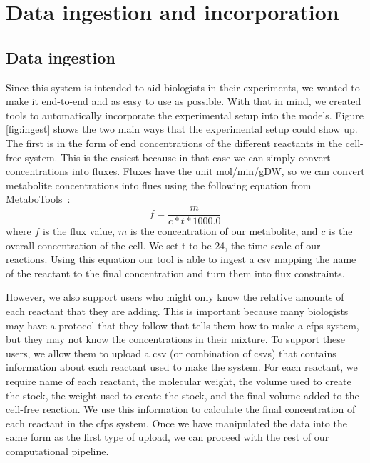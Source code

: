 \section{Data ingestion and incorporation}

\subsection{Data ingestion}
Since this system is intended to aid biologists in their experiments, we wanted to make it end-to-end and as easy to use as possible.
With that in mind, we created tools to automatically incorporate the experimental setup into the models.
Figure \ref{fig:ingest} shows the two main ways that the experimental setup could show up.
The first is in the form of end concentrations of the different reactants in the cell-free system.
This is the easiest because in that case we can simply convert concentrations into fluxes.
Fluxes have the unit mol/min/gDW, so we can convert metabolite concentrations into flues using the following equation from MetaboTools~\cite{aurich2016metabotools}:
\begin{equation}
f = \frac{m}{c * t * 1000.0}
\end{equation}
where $f$ is the flux value, $m$ is the concentration of our metabolite, and $c$ is the overall concentration of the cell.
We set t to be 24, the time scale of our reactions.
Using this equation our tool is able to ingest a \gls{csv} mapping the name of the reactant to the final concentration and turn them into flux constraints.

However, we also support users who might only know the relative amounts of each reactant that they are adding.
This is important because many biologists may have a protocol that they follow that tells them how to make a \gls{cfps} system, but they may not know the concentrations in their mixture.
To support these users, we allow them to upload a \gls{csv} (or combination of \glspl{csv}) that contains information about each reactant used to make the system.
For each reactant, we require name of each reactant, the molecular weight, the volume used to create the stock, the weight used to create the stock, and the final volume added to the cell-free reaction.
We use this information to calculate the final concentration of each reactant in the \gls{cfps} system.
Once we have manipulated the data into the same form as the first type of upload, we can proceed with the rest of our computational pipeline.

